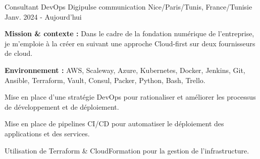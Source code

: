 
\begin{cventries}

\cventry
{Consultant DevOps} %
{Digipulse communication} %
{Nice/Paris/Tunis, France/Tunisie} %
{Janv. 2024 - Aujourd'hui} %
{
  \begin{cvitems} %
    \item {\textbf{Mission \& contexte :} Dans le cadre de la fondation numérique de l'entreprise, je m'emploie à la créer en suivant une approche Cloud-first sur deux fournisseurs de cloud.}
    \item {\textbf{Environnement :} AWS, Scaleway, Azure, Kubernetes, Docker, Jenkins, Git, Ansible, Terraform, Vault, Consul, Packer, Python, Bash, Trello.}
    \item {Mise en place d'une stratégie DevOps pour rationaliser et améliorer les processus de développement et de déploiement.}
    \item {Mise en place de pipelines CI/CD pour automatiser le déploiement des applications et des services.}
    \item {Utilisation de Terraform \& CloudFormation pour la gestion de l'infrastructure.}
  \end{cvitems}
}


\end{cventries}
